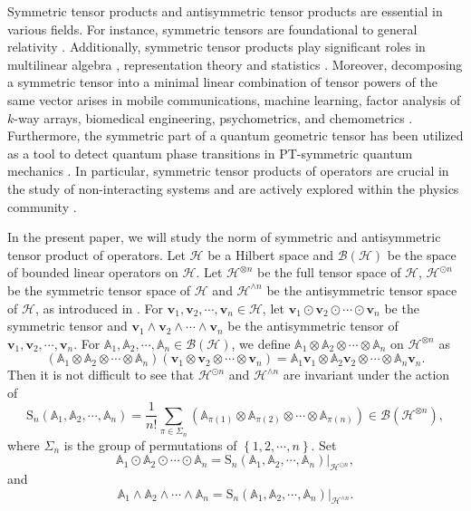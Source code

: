 \documentclass[11pt]{article}
\theoremstyle{plain}
\theoremstyle{definition}
\begin{document}
Symmetric tensor products and antisymmetric tensor products are essential in various fields. 
For instance, symmetric tensors  are foundational to general relativity \cite{in4}. Additionally, symmetric tensor products play  significant roles in multilinear algebra \cite{in5}, representation theory \cite{in6} and statistics \cite{in13}.
Moreover, decomposing a symmetric tensor into a minimal linear combination of tensor powers of
the same vector arises in mobile communications, machine learning, factor analysis of $k$-way
 arrays, biomedical engineering, psychometrics, and chemometrics \cite{in7,in8,in9,in10,in11}.
 Furthermore, the symmetric part of a quantum geometric tensor has been utilized as a tool to detect quantum phase transitions in PT-symmetric quantum mechanics \cite{in18}.
In particular, symmetric tensor products of operators are crucial in the study of non-interacting systems \cite{in14} and are actively explored within the physics community \cite{in15,in16,in17}.

In the present paper, we will study the norm of symmetric and antisymmetric tensor product of operators. 
Let $\mathcal{H}$ be a Hilbert space and $\mathcal{B}(\mathcal{H})$ be the space of bounded linear operators on $\mathcal{H}$. Let $\mathcal{H}^{\otimes n}$ be the full tensor space of $\mathcal{H}$, $\mathcal{H}^{\odot n}$ be the symmetric tensor space of $\mathcal{H}$ and $\mathcal{H}^{\wedge n}$ be the antisymmetric tensor space of $\mathcal{H}$, as introduced in \cite[Page 106]{QU}. For $\mathbf{v}_1, \mathbf{v}_2, \cdots, \mathbf{v}_n \in \mathcal{H}$, let $\mathbf{v}_1 \odot \mathbf{v}_2 \odot \cdots \odot \mathbf{v}_n$ be the symmetric tensor and $\mathbf{v}_1 \wedge \mathbf{v}_2 \wedge \cdots \wedge \mathbf{v}_n$ be the antisymmetric tensor of $\mathbf{v}_1, \mathbf{v}_2, \cdots, \mathbf{v}_n$.
For $\mathbb{A}_{1},\mathbb{A}_{2},\cdots,\mathbb{A}_{n} \in \mathcal{B}(\mathcal{H})$, we define $\mathbb{A}_{1}\otimes\mathbb{A}_{2}\otimes\cdots\otimes\mathbb{A}_{n}$ on $\mathcal{H}^{\otimes n}$ as
$$
\left(\mathbb{A}_{1}\otimes\mathbb{A}_{2}\otimes\cdots\otimes\mathbb{A}_{n}\right)\left(\mathbf{v}_1 \otimes \mathbf{v}_2 \otimes \cdots \otimes \mathbf{v}_n\right)=\mathbb{A}_{1} \mathbf{v}_1 \otimes \mathbb{A}_{2} \mathbf{v}_2 \otimes \cdots \otimes \mathbb{A}_{n} \mathbf{v}_n.
$$
Then it is not difficult to see that $\mathcal{H}^{\odot n}$ and $\mathcal{H}^{\wedge n}$ are invariant under the action of
$$
\mathrm{S}_n\left(\mathbb{A}_{1},\mathbb{A}_{2},\cdots,\mathbb{A}_{n}\right)=\frac{1}{n!} \sum_{\pi \in \Sigma_n}\left(\mathbb{A}_{\pi(1)} \otimes \mathbb{A}_{\pi(2)} \otimes \cdots \otimes \mathbb{A}_{\pi(n)}\right) \in \mathcal{B}\left(\mathcal{H}^{\otimes n}\right),
$$
where $\Sigma_{n}$ is the group of permutations of $\left \{ 1,2,\cdots ,n \right \} $. Set
$$\mathbb{A}_{1} \odot \mathbb{A}_{2} \odot \cdots \odot \mathbb{A}_{n}=\mathrm{S}_{n}\left(\mathbb{A}_{1}, \mathbb{A}_{2}, \cdots, \mathbb{A}_{n}\right)|_{\mathcal{H}^{\odot n}},$$
and
$$\mathbb{A}_{1} \wedge \mathbb{A}_{2} \wedge \cdots \wedge \mathbb{A}_{n}=\mathrm{S}_{n}\left(\mathbb{A}_{1}, \mathbb{A}_{2}, \cdots, \mathbb{A}_{n}\right)|_{\mathcal{H}^{\wedge n}}.$$
\end{document}
